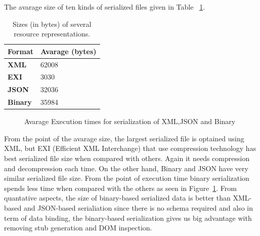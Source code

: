 The avarage size of ten kinds of serialized files given in Table ~\ref{tab:binaryyy}.
\begin{table}
\centering
\begin{tabular}{ p{5.50cm} p{5.50cm} }
\toprule
\multicolumn{1}{l}{\textbf{Format}} & \textbf{Avarage (bytes)}\\
\midrule
\textbf{XML}    & 62008\\
\textbf{EXI}    & 3030\\
\textbf{JSON}   & 32036\\
\textbf{Binary} & 35984\\

\bottomrule
\end{tabular}
\caption[Sizes (in bytes) of several resource representations.]{Sizes (in bytes) of several resource representations.}
\label{tab:binaryyy}
\end{table}
\begin{figure}
\caption{Avarage Execution times for serialization of XML,JSON and Binary}
\label{fig:executiontime}
\end{figure}

From the point of the avarage size, the largest serialized file is optained using XML, but EXI (Efficient XML Interchange) that use compression technology has best serialized file size when compared with others. Again it needs compression and decompression each time. On the other hand, Binary and JSON have very similar serialized file size. From the point of execution time binary serialization spends less time when compared with the others as seen in Figure~\ref{fig:executiontime}. From quantative aspects, the size of binary-based serialized data is better than XML-based and JSON-based serialiation since there is no schema required and also in term of data binding, the binary-based serialization gives us big advantage with removing stub generation and DOM inspection.

